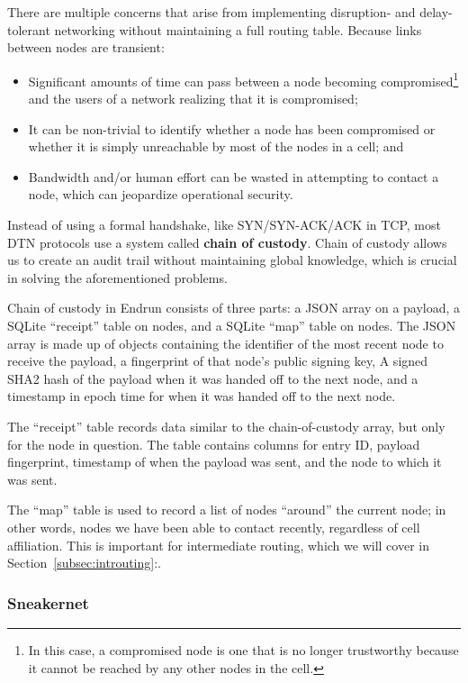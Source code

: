 \documentclass[12pt]{article}
\begin{document}
  There are multiple concerns that arise from implementing disruption- and delay-tolerant networking without maintaining a full routing table. Because links between nodes are transient:
  \begin{itemize}
  
      \item Significant amounts of time can pass between a node becoming compromised\footnote{In this case, a compromised node is one that is no longer trustworthy because it cannot be reached by any other nodes in the cell.} and the users of a network realizing that it is compromised;
      \item It can be non-trivial to identify whether a node has been compromised or whether it is simply unreachable by most of the nodes in a cell; and
      \item Bandwidth and/or human effort can be wasted in attempting to contact a node, which can jeopardize operational security.
      
      \end{itemize}
    
  Instead of using a formal handshake, like SYN/SYN-ACK/ACK in TCP, most DTN protocols use a system called \textbf{chain of custody}. Chain of custody allows us to create an audit trail without maintaining global knowledge, which is crucial in solving the aforementioned problems.
  
  Chain of custody in Endrun consists of three parts: a JSON array on a payload, a SQLite ``receipt'' table on nodes, and a SQLite ``map'' table on nodes. The JSON array is made up of objects containing the identifier of the most recent node to receive the payload, a fingerprint of that node's public signing key, A signed SHA2 hash of the payload when it was handed off to the next node, and a timestamp in epoch time for when it was handed off to the next node. 
  
  The ``receipt'' table records data similar to the chain-of-custody array, but only for the node in question. The table contains columns for entry ID, payload fingerprint, timestamp of when the payload was sent, and the node to which it was sent.
  
  The ``map'' table is used to record a list of nodes ``around'' the current node; in other words, nodes we have been able to contact recently, regardless of cell affiliation. This is important for intermediate routing, which we will cover in Section~\ref{subsec:introuting}:. 
  
  \subsubsection{Sneakernet}
\end{document}
